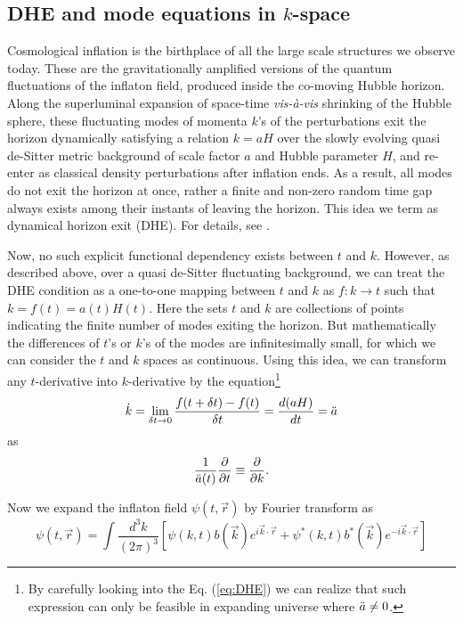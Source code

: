 \documentclass[a4paper,11pt]{article}
\begin{document}
\subsection{\boldmath DHE and mode equations in \texorpdfstring{$k$}{k}-space}
\label{sec:k space}
Cosmological inflation is the birthplace of all the large scale structures we observe today. These are the gravitationally amplified versions of the quantum fluctuations of the inflaton field, produced inside the co-moving Hubble horizon. Along the superluminal expansion of space-time \textit{vis-\`{a}-vis} shrinking of the Hubble sphere, these fluctuating modes of momenta $k$'s of the perturbations exit the horizon dynamically satisfying a relation $k=aH$ over the slowly evolving quasi de-Sitter metric background \cite{Baumann:2009ds} of scale factor $a$ and Hubble parameter $H$, and re-enter as classical density perturbations after inflation ends. As a result, all modes do not exit the horizon at once, rather a finite and non-zero random time gap always exists among their instants of leaving the horizon. This idea we term as dynamical horizon exit (DHE). For details, see \cite{Sarkar:2021ird}.\par Now, no such explicit functional dependency exists between $t$ and $k$. However, as described above, over a quasi de-Sitter fluctuating background, we can treat the DHE condition as a one-to-one mapping between $t$ and $k$ as $f:k\rightarrow t$ such that $k=f(t)=a(t)H(t)$. Here the sets $t$ and $k$ are collections of points indicating the finite number of modes exiting the horizon. But mathematically the differences of $t$'s or $k$'s of the modes are infinitesimally small, for which we can consider the $t$ and $k$ spaces as continuous. Using this idea, we can transform any $t$-derivative into $k$-derivative by the equation\footnote{By carefully looking into the Eq. (\ref{eq:DHE}) we can realize that such expression can only be feasible in expanding universe where $\Ddot{a}\neq 0$.}
\begin{equation}
    \Dot{k}=\lim_{\delta t\rightarrow 0}\frac{f(t+\delta t)-f(t)}{\delta t}=\frac{d(aH)}{dt}=\Ddot{a}
\end{equation}
as
\begin{equation}
    \frac{1}{\Ddot{a}(t)}\frac{\partial}{\partial t}\equiv \frac{\partial}{\partial k}.
    \label{eq:DHE}
\end{equation}
\par Now we expand the inflaton field $\psi(t,\Vec{r})$ by Fourier transform as
\begin{equation}
    \psi(t,\Vec{r})=\int\frac{d^3 k}{(2\pi)^3}\left[\psi(k,t)b(\Vec{k})e^{i\Vec{k}\cdot\Vec{r}}+\psi^{*}(k,t)b^{*}(\Vec{k})e^{-i\Vec{k}\cdot\Vec{r}}\right]
\end{equation}
\end{document}
